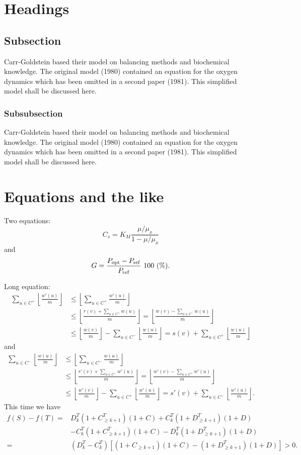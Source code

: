 \documentclass[pamq,keywordsasfootnote]{ipart}
\def\SM#1#2{\sum_{#1\in #2}}
\def\FL#1{\left\lfloor #1 \right\rfloor}
\def\FR#1#2{{\frac{#1}{#2}}}
\begin{document}
\section{Headings}

\subsection{Subsection}
Carr-Goldstein based their model on balancing methods and
biochemical know\-ledge. The original model (1980) contained an equation for the
oxygen dynamics which has been omitted in a second paper
(1981). This simplified model shall be discussed here.

\subsubsection{Subsubsection}
Carr-Goldstein
based their model on balancing methods and
biochemical know\-ledge. The original model (1980) contained an equation for the
oxygen dynamics which has been omitted in a second paper
(1981). This simplified model shall be discussed here.

\section{Equations and the like}

Two equations:
\begin{equation}
    C_{s}  =  K_{M} \frac{\mu/\mu_{x}}{1-\mu/\mu_{x}} \label{ccs}
\end{equation}
and
\begin{equation}
    G = \frac{P_{\rm opt} - P_{\rm ref}}{P_{\rm ref}} \mbox{\ }100 \mbox{\ }(\%).
\end{equation}

Long equation:
\begin{align}
\SM u{C^+}\FL{\FR{w'(u)}m}&\le \FL{\SM u{C^+} \FR{w'(u)}m}\nonumber\\ &\le
\FL{\FR{r(v)+\SM u{C^+} w(u)}m} = \FL{\FR{w(v)-\SM u{C^-} w(u)}m}\nonumber\\
&\le \FL{\FR{w(v)}m}-\SM u{C^-}\FL{\FR{w(u)}m}
= s(v)+\SM u{C^+}\FL{\FR{w(u)}m}
\end{align}
and
\begin{align}
\SM u{C^-}\FL{\FR{w(u)}m}&\le \FL{\SM u{C^-} \FR{w(u)}m}\nonumber\\ & \le
\FL{\FR{r'(v)+\SM u{C^-} w'(u)}m} = \FL{\FR{w'(v)-\SM u{C^+} w'(u)}m}\nonumber\\
&\le \FL{\FR{w'(v)}m}-\SM u{C^+}\FL{\FR{w'(u)}m}
= s'(v)+\SM u{C^-}\FL{\FR{w'(u)}m}.
\end{align}
This time we have
\begin{align*}
f(S)-f(T) =    {}  &  D_k^T(1+C_{\geq k+1}^T)(1 + C) + C_k^T(1+D_{\geq k+1}^T)(1 + D) \\
        {}   &  - C_k^T(1+C_{\geq k+1}^T)(1 + C) - D_k^T(1+D_{\geq k+1}^T)(1 + D)   \\
=     {} &   (D_k^T-C_k^T)[(1+C_{\geq k+1})(1+C)-(1+D_{\geq
k+1}^T)(1+D)]>0.
\end{align*}
\end{document}
